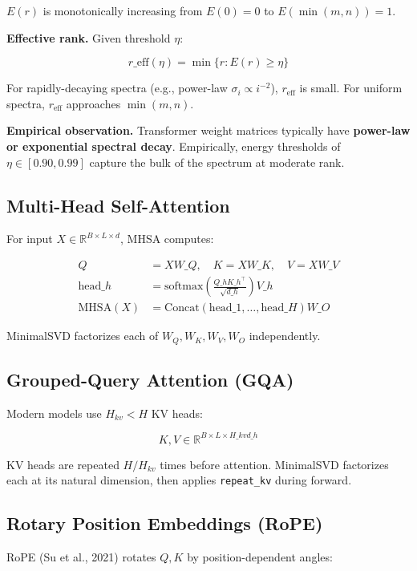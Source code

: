 $E(r)$ is monotonically increasing from $E(0) = 0$ to $E(\min(m, n)) = 1$.

\textbf{Effective rank.} Given threshold $\eta$:

\[
r\_\text{eff}(\eta) = \min\{r : E(r) \geq \eta\}
\tag{3.6}
\]

For rapidly-decaying spectra (e.g., power-law $\sigma_i \propto i^{-2}$), 
$r_\text{eff}$ is small. For uniform spectra, $r_\text{eff}$ approaches 
$\min(m, n)$.

\textbf{Empirical observation.} Transformer weight matrices typically have 
\textbf{power-law or exponential spectral decay}. Empirically, energy thresholds 
of $\eta \in [0.90, 0.99]$ capture the bulk of the spectrum at moderate rank.

\subsection{Multi-Head Self-Attention}

For input $X \in \mathbb{R}^{B \times L \times d}$, MHSA computes:

\[
\begin{aligned}
Q &= X W\_Q, \quad K = X W\_K, \quad V = X W\_V \\
\text{head}\_h &= \text{softmax}\!\left(\frac{Q\_h K\_h^\top}{\sqrt{d\_h}}\right) V\_h \\
\text{MHSA}(X) &= \text{Concat}(\text{head}\_1, \dots, \text{head}\_H) W\_O
\end{aligned}
\tag{3.7}
\]

MinimalSVD factorizes each of $W_Q, W_K, W_V, W_O$ independently.

\subsection{Grouped-Query Attention (GQA)}

Modern models use $H_{kv} < H$ KV heads:

\[
K, V \in \mathbb{R}^{B \times L \times H\_{kv} d\_h}
\tag{3.8}
\]

KV heads are repeated $H / H_{kv}$ times before attention. MinimalSVD 
factorizes each at its natural dimension, then applies \texttt{repeat\_kv} during 
forward.

\subsection{Rotary Position Embeddings (RoPE)}

RoPE (Su et al., 2021) rotates $Q, K$ by position-dependent angles:

